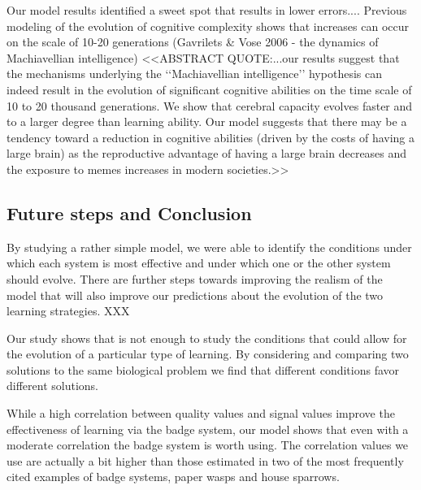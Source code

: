 Our model results identified a sweet spot that results in lower errors....
 Previous modeling of the evolution of cognitive complexity shows that increases can occur on the scale of 10-20 generations (Gavrilets \& Vose 2006 - the dynamics of Machiavellian intelligence) <<ABSTRACT QUOTE:...our results suggest that the mechanisms underlying the ‘‘Machiavellian intelligence’’ hypothesis can indeed result in the evolution of significant cognitive abilities on the time scale of 10 to 20 thousand generations. We show that cerebral capacity evolves faster and to a larger degree than learning ability. Our model suggests that there may be a tendency toward a reduction in cognitive abilities (driven by the costs of having a large brain) as the reproductive advantage of having a large brain decreases and the exposure to memes increases in modern societies.>>
 
\subsection*{Future steps and Conclusion}
 
By studying a rather simple model, we were able to identify the conditions under which each system is most effective and under which one or the other system should evolve. There are further steps towards improving the realism of the model that will also improve our predictions about the evolution of the two learning strategies. XXX

Our study shows that is not enough to study the conditions that could allow for the evolution of a particular type of learning. By considering and comparing two solutions to the same biological problem we find that different conditions favor different solutions. %
 
 
While a high correlation between quality values and signal values improve the effectiveness of learning via the badge system, our model shows that even with a moderate correlation the badge system is worth using. The correlation values we use are actually a bit higher than those estimated in two of the most frequently cited examples of badge systems, paper wasps and house sparrows.

